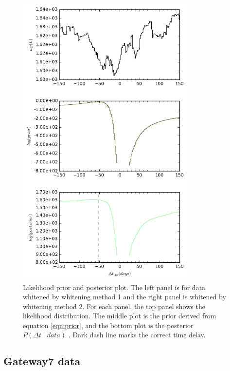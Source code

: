 \documentclass[\docopts]{\docclass}
\begin{document}
\begin{figure}[!h]
\begin{minipage}[bottom]{0.4\textwidth}
\includegraphics[width=\textwidth, height=15cm, keepaspectratio]{whiten2/data6_full_log.png}
  \end{minipage}
 \caption{Likelihood prior and posterior plot. The left panel is for data whitened by whitening method 1 and the right panel is whitened by whitening method 2. For each panel, the top panel shows the likelihood distribution. The middle plot is the prior derived from equation \ref{eqn:prior}, and the bottom plot is the posterior $P(\Delta t \mid data)$ . Dark dash line marks the correct time delay. }
\end{figure}
\newpage

\subsection{Gateway7 data}
\end{document}
